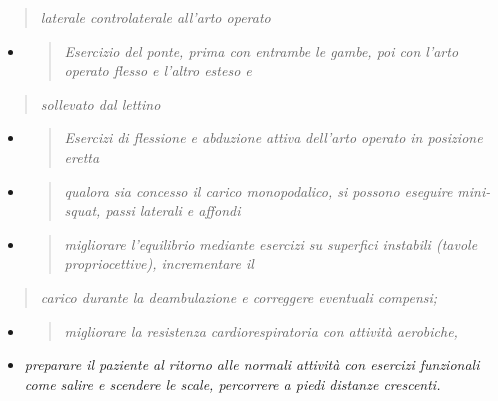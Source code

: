 \documentclass[]{article}
\begin{document}
\begin{quote}
\emph{laterale controlaterale all'arto operato}
\end{quote}

\begin{itemize}
\item
  \begin{quote}
  \emph{Esercizio del ponte, prima con entrambe le gambe, poi con l'arto
  operato flesso e l'altro esteso e}
  \end{quote}
\end{itemize}

\begin{quote}
\emph{sollevato dal lettino}
\end{quote}

\begin{itemize}
\item
  \begin{quote}
  \emph{Esercizi di flessione e abduzione attiva} \emph{dell'arto
  operato in posizione eretta}
  \end{quote}
\end{itemize}

\begin{itemize}
\item
  \begin{quote}
  \emph{qualora sia concesso il carico monopodalico, si possono eseguire
  mini-squat, passi laterali e affondi}
  \end{quote}
\item
  \begin{quote}
  \emph{migliorare l'equilibrio mediante esercizi su superfici instabili
  (tavole propriocettive), incrementare il}
  \end{quote}
\end{itemize}

\begin{quote}
\emph{carico durante la deambulazione e correggere eventuali compensi;}
\end{quote}

\begin{itemize}
\item
  \begin{quote}
  \emph{migliorare la resistenza cardiorespiratoria con attività
  aerobiche,}
  \end{quote}
\item
  \emph{preparare il paziente al ritorno alle normali attività con
  esercizi funzionali come salire e scendere le scale, percorrere a
  piedi distanze crescenti.}
\end{itemize}
\end{document}
